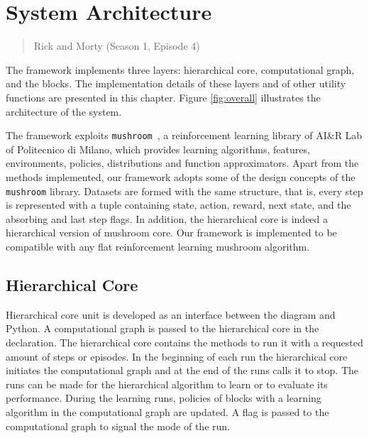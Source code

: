 \chapter{System Architecture}
\label{architecture}
\thispagestyle{empty}

\begin{quotation}
{\footnotesize
{}
\begin{flushright}
Rick and Morty (Season 1, Episode 4)
\end{flushright}
}
\end{quotation}



\vspace{0.5cm}

The framework implements three layers: hierarchical core, computational graph, and the blocks. The implementation details of these layers and of other utility functions are presented in this chapter. Figure \ref{fig:overall} illustrates the architecture of the system.

The framework exploits \texttt{mushroom}~\cite{mushroom}, a reinforcement learning library of AI\&R Lab of Politecnico di Milano, which provides learning algorithms, features, environments, policies, distributions and function approximators. Apart from the methods implemented, our framework adopts some of the design concepts of the \texttt{mushroom} library. Datasets are formed with the same structure, that is, every step is represented with a tuple containing state, action, reward, next state, and the absorbing and last step flags. In addition, the hierarchical core is indeed a hierarchical version of mushroom core. Our framework is implemented to be compatible with any flat reinforcement learning mushroom algorithm.

\section{Hierarchical Core}
Hierarchical core unit is developed as an interface between the diagram and Python. A computational graph is passed to the hierarchical core in the declaration. The hierarchical core contains the methods to run it with a requested amount of steps or episodes. In the beginning of each run the hierarchical core initiates the computational graph and at the end of the runs calls it to stop. The runs can be made for the hierarchical algorithm to learn or to evaluate its performance. During the learning runs, policies of blocks with a learning algorithm in the computational graph are updated. A flag is passed to the computational graph to signal the mode of the run. 

